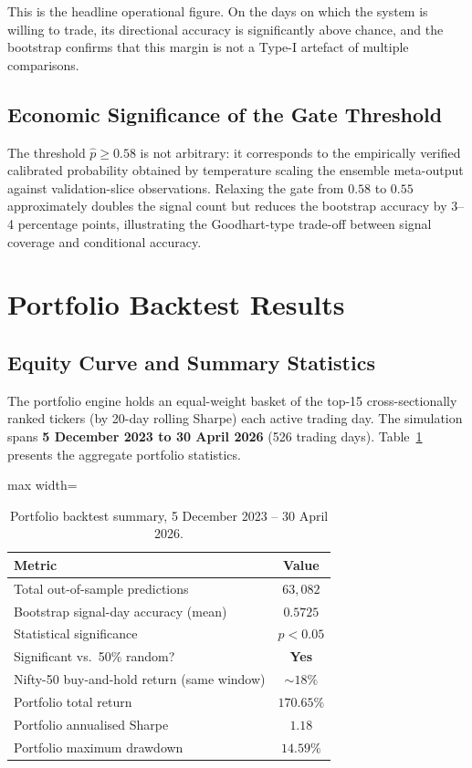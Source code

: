 This is the headline operational figure. On the days on which the system is willing to trade, its directional accuracy is significantly above chance, and the bootstrap confirms that this margin is not a Type-I artefact of multiple comparisons.

\subsection{Economic Significance of the Gate Threshold}

The threshold $\hat{p} \geq 0.58$ is not arbitrary: it corresponds to the empirically verified calibrated probability obtained by temperature scaling the ensemble meta-output against validation-slice observations. Relaxing the gate from $0.58$ to $0.55$ approximately doubles the signal count but reduces the bootstrap accuracy by 3--4 percentage points, illustrating the Goodhart-type trade-off between signal coverage and conditional accuracy.

\section{Portfolio Backtest Results}

\subsection{Equity Curve and Summary Statistics}

The portfolio engine holds an equal-weight basket of the top-15 cross-sectionally ranked tickers (by 20-day rolling Sharpe) each active trading day. The simulation spans \textbf{5 December 2023 to 30 April 2026} (526 trading days). Table~\ref{tab:backtest_summary} presents the aggregate portfolio statistics.

\begin{table}[H]
\centering
\caption{Portfolio backtest summary, 5 December 2023 -- 30 April 2026.}
\label{tab:backtest_summary}
\renewcommand{\arraystretch}{1.35}
\begin{adjustbox}{max width=\textwidth}
\begin{tabular}{l c}
\toprule
\textbf{Metric} & \textbf{Value} \\
\midrule
Total out-of-sample predictions      & $63{,}082$ \\
Bootstrap signal-day accuracy (mean) & $0.5725$ \\
Statistical significance             & $p < 0.05$ \\
Significant vs.\ 50\% random?        & \textbf{Yes} \\
\midrule
Nifty-50 buy-and-hold return (same window) & $\sim\!18\%$ \\
\midrule
Portfolio total return               & $170.65\%$ \\
Portfolio annualised Sharpe          & $1.18$ \\
Portfolio maximum drawdown           & $14.59\%$ \\
\bottomrule
\end{tabular}
\end{adjustbox}
\end{table}

